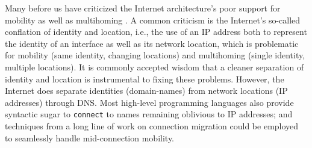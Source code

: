 

Many before us have criticized the Internet architecture's poor support for mobility as well as multihoming \cite{HIP,LISP,HAIR,MobilityFirst}. A common criticism is the Internet's so-called conflation of identity and location, i.e., the use of an IP address both to represent the identity of an interface as well as its network location, which is problematic for mobility (same identity, changing locations) and multihoming (single identity, multiple locations). It is commonly accepted wisdom that a cleaner separation of identity and location is instrumental to fixing these problems. However, the Internet does separate identities (domain-names) from network locations (IP addresses) through DNS. Most high-level programming languages also provide syntactic sugar to \verb+connect+ to names remaining oblivious to IP addresses; and %
techniques from a long line of work on connection migration could be employed to seamlessly handle mid-connection mobility.

